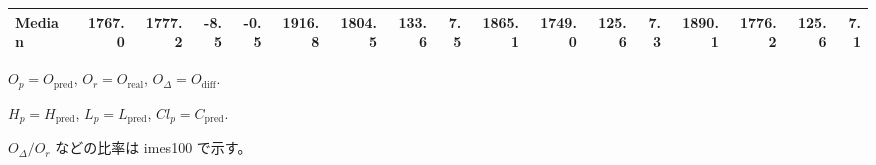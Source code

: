 \begin{threeparttable}
{\begin{tabular}{lrrrrrrrrrrrrrrrr}
 Median & 1767.0 & 1777.2 &       -8.5 &           -0.5 & 1916.8 & 1804.5 &      133.6 &            7.5 & 1865.1 & 1749.0 &      125.6 &            7.3 & 1890.1 & 1776.2 &       125.6 &              7.1 \\
\bottomrule
\end{tabular}
}
\begin{tablenotes}\footnotesize
\item $O_p=O_{\text{pred}}$, $O_r=O_{\text{real}}$, $O_\Delta=O_{\text{diff}}$.
\item $H_p=H_{\text{pred}}$, $L_p=L_{\text{pred}}$, $Cl_p=C_{\text{pred}}$.
\item $O_\Delta/O_r$ などの比率は 	imes100 で示す。
\end{tablenotes}
\end{threeparttable}
\endgroup
